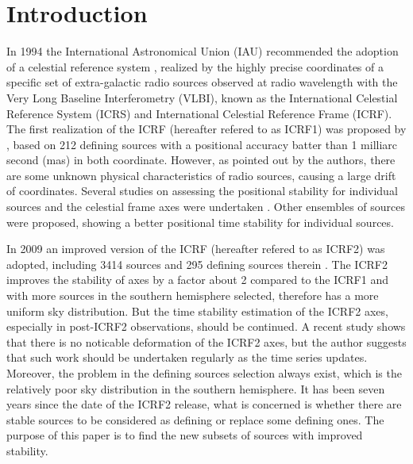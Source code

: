 \documentclass{aa}
\begin{document}
\section{Introduction}
In 1994 the International Astronomical Union (IAU) recommended the adoption of a celestial reference system \citep{Arias1995}, realized by the highly precise coordinates of a specific set of extra-galactic radio sources observed at radio wavelength with the Very Long Baseline Interferometry (VLBI), known as the International Celestial Reference System (ICRS) and International Celestial Reference Frame (ICRF). The first realization of the ICRF (hereafter refered to as ICRF1) was proposed by \cite{ma1998}, based on 212 defining sources with a positional accuracy batter than 1 milliarc second (mas) in both coordinate. However, as pointed out by the authors, there are some unknown physical characteristics of radio sources, causing a large drift of coordinates. Several studies on assessing the positional stability for individual sources and the celestial frame axes were undertaken \citep[see][]{Feissel2000,AMGontier2001,FV2003,Feissel-Vernier2006,gontier2008,Lambert2009}. Other ensembles of sources were proposed, showing a better positional time stability for individual sources.

In 2009 an improved version of the ICRF (hereafter refered to as ICRF2) was adopted, including 3414 sources and 295 defining sources therein \citep{2009ITN....35....1M,IERS2}. The ICRF2 improves the stability of axes by a factor about 2 compared to the ICRF1 and with more sources in the southern hemisphere selected, therefore has a more uniform sky distribution. But the time stability estimation of the ICRF2 axes, especially in post-ICRF2 observations, should be continued. A recent study \citep{Lambert2013} shows that there is no noticable deformation of the ICRF2 axes, but the author suggests that such work should be undertaken regularly as the time series updates. Moreover, the problem in the defining sources selection always exist, which is the relatively poor sky distribution in the southern hemisphere. It has been seven years since the date of the ICRF2 release, what is concerned is whether there are stable sources to be considered as defining or replace some defining ones. The purpose of this paper is to find the new subsets of sources with improved stability. 
\end{document}
